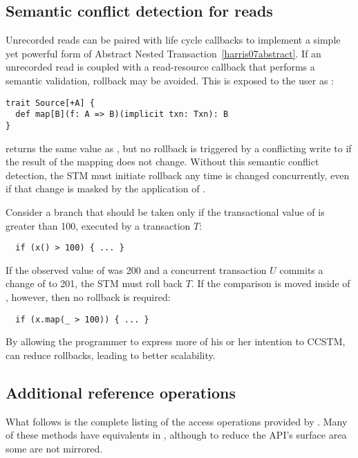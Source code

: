 \subsection{Semantic conflict detection for reads}
\label{sec:map}

Unrecorded reads can be paired with life cycle callbacks to implement a simple
yet powerful form of Abstract Nested Transaction~\ref{harris07abstract}.
If an unrecorded read is coupled with a read-resource callback that
performs a semantic validation, rollback may be avoided.  This is exposed
to the user as :
\lstset{numbers=none}
\begin{lstlisting}
trait Source[+A] {
  def map[B](f: A => B)(implicit txn: Txn): B
}
\end{lstlisting}
\lstset{numbers=left}
 returns the same value as , but no rollback
is triggered by a conflicting write to  if the result of the mapping
does not change.  Without this
semantic conflict detection, the STM must initiate rollback any time 
is changed concurrently, even if that change is masked by the application of
.

Consider a branch that should be taken only if the transactional value of
 is greater than 100, executed by a transaction $T$:
\lstset{numbers=none}
\begin{lstlisting}
  if (x() > 100) { ... }
\end{lstlisting}
\lstset{numbers=left}
If the observed value of  was 200 and a concurrent transaction $U$ commits
a change of  to 201, the STM must roll back $T$.  If the comparison is
moved inside of , however, then no rollback is required:
\lstset{numbers=none}
\begin{lstlisting}
  if (x.map(_ > 100)) { ... }
\end{lstlisting}
\lstset{numbers=left}
By allowing the programmer to express more of his or her intention to CCSTM,
 can reduce rollbacks, leading to better scalability.

\subsection{Additional reference operations}

What follows is the complete listing of the access operations provided by
.  Many of these methods have equivalents in ,
although to reduce the API's surface area some are not mirrored.

